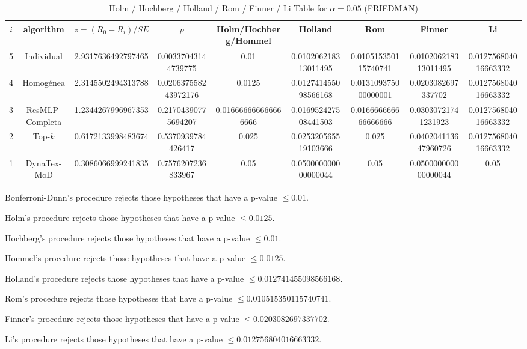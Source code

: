 \documentclass[a4paper,10pt]{article}
\begin{document}
\begin{landscape}
\begin{table}[!htp]
\centering\scriptsize
\caption{Holm / Hochberg / Holland / Rom / Finner / Li Table for $\alpha=0.05$ (FRIEDMAN)}
\begin{tabular}{ccccccccc}
$i$&algorithm&$z=(R_0 - R_i)/SE$&$p$&Holm/Hochberg/Hommel&Holland&Rom&Finner&Li\\
\hline
5&Individual&2.9317636492797465&0.00337043144739775&0.01&0.010206218313011495&0.010515350115740741&0.010206218313011495&0.012756804016663332\\
4&Homogénea&2.3145502494313788&0.020637558243972176&0.0125&0.012741455098566168&0.013109375000000001&0.0203082697337702&0.012756804016663332\\
3&ResMLP-Completa&1.2344267996967353&0.21704390775694207&0.016666666666666666&0.016952427508441503&0.016666666666666666&0.03030721741231923&0.012756804016663332\\
2&Top-$k$&0.6172133998483674&0.5370939784426417&0.025&0.025320565519103666&0.025&0.040204113647960726&0.012756804016663332\\
1&DynaTex-MoD&0.3086066999241835&0.7576207236833967&0.05&0.050000000000000044&0.05&0.050000000000000044&0.05\\
\hline
\end{tabular}
\end{table}
Bonferroni-Dunn's procedure rejects those hypotheses that have a p-value $\le0.01$.


Holm's procedure rejects those hypotheses that have a p-value $\le0.0125$.


Hochberg's procedure rejects those hypotheses that have a p-value $\le0.01$.


Hommel's procedure rejects those hypotheses that have a p-value $\le0.0125$.


Holland's procedure rejects those hypotheses that have a p-value $\le0.012741455098566168$.


Rom's procedure rejects those hypotheses that have a p-value $\le0.010515350115740741$.


Finner's procedure rejects those hypotheses that have a p-value $\le0.0203082697337702$.


Li's procedure rejects those hypotheses that have a p-value $\le0.012756804016663332$.



\newpage


\end{landscape}
\end{document}
